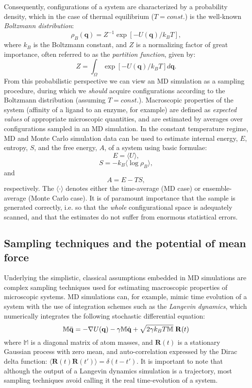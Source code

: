 \documentclass[a4paper,11pt,twoside]{book}%
\begin{document}
Consequently, configurations of a system are characterized by a probability density, which in the case of thermal equilibrium ($T=const.$) is the well-known \emph{Boltzmann distribution}:
\begin{equation}
 \rho_B(\mathbf{q})=Z^{-1} \exp[-U(\mathbf{q})/k_BT],
\end{equation}
where $k_B$ is the Boltzmann constant, and $Z$ is a normalizing factor of great importance, often referred to as the \emph{partition function}, given by: 
$$Z=\int_\Omega \exp[-U(\mathbf{q})/k_BT] d\mathbf{q}.$$
From this probabilistic perspective we can view an MD simulation as a sampling procedure, during which we \emph{should} acquire configurations according to the Boltzmann distribution (assuming $T=const.$).
Macroscopic properties of the system (affinity of a ligand to an enzyme, for example) are defined as \emph{expected values} of appropriate microscopic quantities, and are estimated by averages over configurations sampled in an MD simulation.
In the constant temperature regime, MD and Monte Carlo simulation data can be used to estimate internal energy, $E$, entropy, $S$, and the free energy, $A$, of a system using basic formulae: 
$$E = \langle U \rangle,$$ 
$$S = -k_B \langle \log \rho_B \rangle,$$
and 
$$A = E - TS,$$ 
respectively.
The $\langle \cdot \rangle$ denotes either the time-average (MD case) or ensemble-average (Monte Carlo case).
It is of paramount importance that the sample is generated correctly, i.e. so that the \emph{whole} configurational space is adequately scanned, and that the estimates do not suffer from enormous statistical errors.


\subsection{Sampling techniques and the potential of mean force}

Underlying the simplistic, classical assumptions embedded in MD simulations are complex sampling techniques used for estimating macroscopic properties of microscopic systems.
MD simulations can, for example, mimic time evolution of a system with the use of integration schemes such as the \emph{Langevin dynamics}, which numerically integrates the following stochastic differential equation:
$$
 \mathbb{M}\ddot{\mathbf{q}} = -\nabla U(\mathbf{q}) -\gamma \mathbb{M}\dot{\mathbf{q}} + \sqrt{2\gamma k_BT\mathbb{M}}\hspace{0.1cm}\mathbf{R}(t)
$$
where $\mathbb{M}$ is a diagonal matrix of atom masses, and $\mathbf{R}(t)$ is a stationary Gaussian process with zero mean, and auto-correlation expressed by the Dirac delta function: $\langle \mathbf{R}(t)\mathbf{R}(t') \rangle = \delta(t-t')$. 
It is important to note that although the output of a Langevin dynamics simulation is a trajectory, most sampling techniques avoid calling it the real time-evolution of a system.
\end{document}
